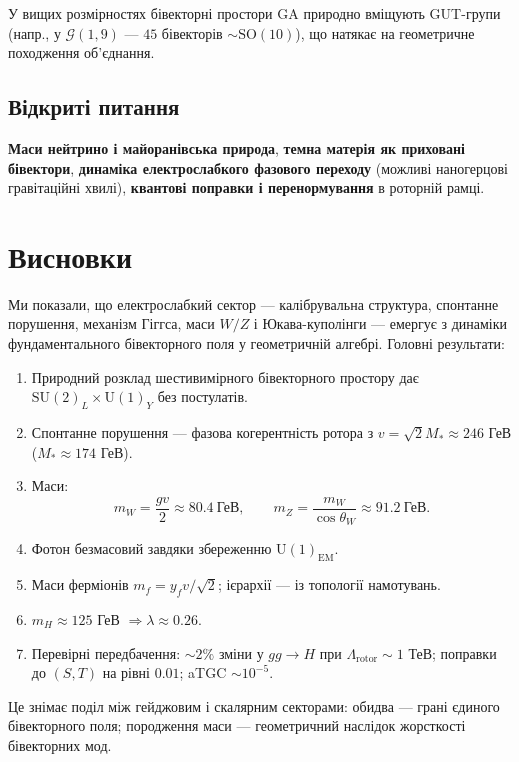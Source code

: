 \documentclass[11pt,a4paper]{article}
\newcommand{\SU}{\mathrm{SU}}
\newcommand{\UU}{\mathrm{U}}
\newcommand{\SO}{\mathrm{SO}}
\theoremstyle{definition}
\theoremstyle{plain}
\theoremstyle{remark}
\begin{document}
У вищих розмірностях бівекторні простори GA природно вміщують GUT-групи (напр., у $\mathcal{G}(1,9)$ — $45$ бівекторів $\sim \SO(10)$), що натякає на геометричне походження об’єднання.

\subsection{Відкриті питання}

\textbf{Маси нейтрино і майоранівська природа}, \textbf{темна матерія як приховані бівектори}, \textbf{динаміка електрослабкого фазового переходу} (можливі наногерцові гравітаційні хвилі), \textbf{квантові поправки і перенормування} в роторній рамці.

\vspace{1em}

\section{Висновки}\label{sec:conclusion}

Ми показали, що електрослабкий сектор — калібрувальна структура, спонтанне порушення, механізм Гіггса, маси $W/Z$ і Юкава-куполінги — емергує з динаміки фундаментального бівекторного поля у геометричній алгебрі. Головні результати:

\begin{enumerate}[leftmargin=*,itemsep=3pt]
  \item Природний розклад шестивимірного бівекторного простору дає $\SU(2)_L \times \UU(1)_Y$ без постулатів.
  \item Спонтанне порушення — фазова когерентність ротора з $v=\sqrt{2}M_\ast\approx 246$ ГеВ ($M_\ast\approx 174$ ГеВ).
  \item Маси:
  \[
  m_W = \frac{gv}{2} \approx 80{.}4~\text{ГеВ},\qquad
  m_Z = \frac{m_W}{\cos\theta_W} \approx 91{.}2~\text{ГеВ}.
  \]
  \item Фотон безмасовий завдяки збереженню $\UU(1)_{\text{EM}}$.
  \item Маси ферміонів $m_f = y_f v/\sqrt{2}$; ієрархії — із топології намотувань.
  \item $m_H \approx 125$ ГеВ $\Rightarrow \lambda \approx 0{.}26$.
  \item Перевірні передбачення: $\sim2\%$ зміни у $gg\to H$ при $\Lambda_{\text{rotor}}\sim 1$ ТеВ; поправки до $(S,T)$ на рівні $0{.}01$; aTGC $\sim 10^{-5}$.
\end{enumerate}

Це знімає поділ між гейджовим і скалярним секторами: обидва — грані єдиного бівекторного поля; породження маси — геометричний наслідок жорсткості бівекторних мод.
\end{document}
